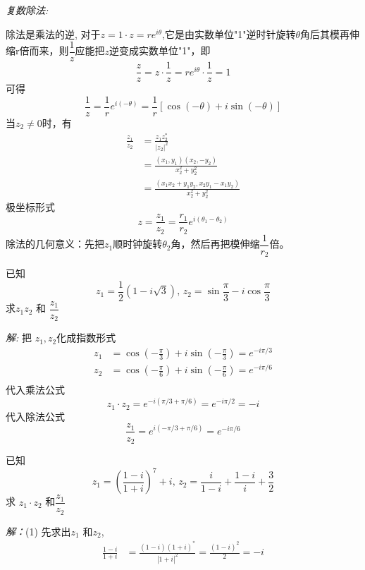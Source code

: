 \noindent \emph{复数除法: } 

除法是乘法的逆, 对于$z= 1 \cdot z = r e^{i\theta}$,它是由实数单位"1"逆时针旋转$\theta$角后其模再伸缩r倍而来，则$\dfrac{1}{z}$应能把$z$逆变成实数单位"1"，即 
\[ \frac{z}{z} = z \cdot \frac{1}{z}  = r e^{i\theta} \cdot \frac{1}{z}   =1 \]
可得
\begin{equation}\label{}
    \frac{1}{z} = \frac{1}{r} e^{i(- \theta)}  = \frac{1}{r} [\cos(-\theta) + i \sin(- \theta)]
\end{equation}
当$z_2 \ne 0$时，有 
\begin{equation}\label{}
    \begin{aligned}
    \frac{z_1}{z_2} &=  \frac{z_1 z^*_2 }{|z_2|^2 }  \\ 
    &= \frac{(x_1, y_1)(x_2, -y_2) }{x^2_2+ y^2_2}   \\
    &= \frac{(x_1x_2 + y_1y_2, x_2y_1 -x_1y_2)}{x^2_2+ y^2_2}   
\end{aligned} 
\end{equation}
极坐标形式
\begin{equation}\label{}
      z = \frac{z_1}{z_2} = \frac{r_1}{r_2} e^{i(\theta _1 - \theta _2)}  
\end{equation}
除法的几何意义：先把$z_1$顺时钟旋转$\theta_2$角，然后再把模伸缩$\dfrac{1}{r_2}$倍。\\
\begin{example}
    已知
	\[ z_1 = \frac{1}{2}(1-i\sqrt{3}), \, z_2 = \sin \frac{\pi}{3} -i \cos \frac{\pi}{3}\]
	求$z_1z_2$ 和 $\dfrac{z_1}{z_2}$
\end{example}
\emph{解: } 把 $z_1, z_2$化成指数形式
\[ \begin{aligned}
    z_1 &= \cos (- \frac{\pi}{3}) + i  \sin  (- \frac{\pi}{3})  = e^{-i \pi /3}\\
    z_2 &= \cos (- \frac{\pi}{6}) + i  \sin  (- \frac{\pi}{6})  = e^{-i \pi /6}\\
\end{aligned}\]
代入乘法公式
\[ z_1 \cdot z_2 = e^{-i (\pi /3 +\pi /6) } = e^{-i \pi /2 } = -i\]
代入除法公式
\[ \dfrac{z_1}{z_2} = e^{i (-\pi /3 + \pi /6) } = e^{-i \pi /6 } \]
\begin{example}
    已知 
	\[ z_1 = \left( \frac{1-i}{1+i}\right)^7 + i, \, z_2 = \frac{i}{1-i} + \frac{1-i}{i}  + \frac{3}{2}\] 
	求 $z_1 \cdot z_2 $ 和$\dfrac{z_1}{z_2}$ 
\end{example}
\emph{解：}(1) 先求出$z_1$ 和$z_2$, 
\[ \begin{aligned}
    \frac{1-i}{1+i} &= \frac{(1-i)(1+i)^*}{|1+i|^2} = \frac{(1-i)^2}{2}  = -i 
\end{aligned}\]
